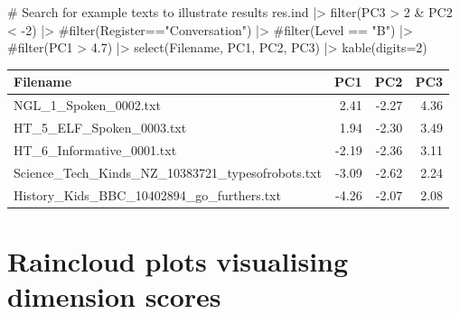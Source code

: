 \documentclass[
  letterpaper,
  DIV=11,
  numbers=noendperiod]{scrreprt}
\newenvironment{Shaded}{\begin{snugshade}}{\end{snugshade}}
\newcommand{\AttributeTok}[1]{\textcolor[rgb]{0.40,0.45,0.13}{#1}}
\newcommand{\CommentTok}[1]{\textcolor[rgb]{0.37,0.37,0.37}{#1}}
\newcommand{\DecValTok}[1]{\textcolor[rgb]{0.68,0.00,0.00}{#1}}
\newcommand{\FunctionTok}[1]{\textcolor[rgb]{0.28,0.35,0.67}{#1}}
\newcommand{\NormalTok}[1]{\textcolor[rgb]{0.00,0.23,0.31}{#1}}
\newcommand{\SpecialCharTok}[1]{\textcolor[rgb]{0.37,0.37,0.37}{#1}}
\begin{document}
\begin{Shaded}
\begin{Highlighting}[]
\CommentTok{\# Search for example texts to illustrate results}
\NormalTok{res.ind }\SpecialCharTok{|\textgreater{}} 
  \FunctionTok{filter}\NormalTok{(PC3 }\SpecialCharTok{\textgreater{}} \DecValTok{2} \SpecialCharTok{\&}\NormalTok{ PC2 }\SpecialCharTok{\textless{}} \SpecialCharTok{{-}}\DecValTok{2}\NormalTok{) }\SpecialCharTok{|\textgreater{}} 
  \CommentTok{\#filter(Register=="Conversation") |\textgreater{} }
  \CommentTok{\#filter(Level == "B") |\textgreater{} }
  \CommentTok{\#filter(PC1 \textgreater{} 4.7) |\textgreater{} }
  \FunctionTok{select}\NormalTok{(Filename, PC1, PC2, PC3) }\SpecialCharTok{|\textgreater{}} 
  \FunctionTok{kable}\NormalTok{(}\AttributeTok{digits=}\DecValTok{2}\NormalTok{)}
\end{Highlighting}
\end{Shaded}

\begin{longtable}[]{@{}lrrr@{}}
\toprule\noalign{}
Filename & PC1 & PC2 & PC3 \\
\midrule\noalign{}
\endhead
\bottomrule\noalign{}
\endlastfoot
NGL\_1\_Spoken\_0002.txt & 2.41 & -2.27 & 4.36 \\
HT\_5\_ELF\_Spoken\_0003.txt & 1.94 & -2.30 & 3.49 \\
HT\_6\_Informative\_0001.txt & -2.19 & -2.36 & 3.11 \\
Science\_Tech\_Kinds\_NZ\_10383721\_typesofrobots.txt & -3.09 & -2.62 &
2.24 \\
History\_Kids\_BBC\_10402894\_go\_furthers.txt & -4.26 & -2.07 & 2.08 \\
\end{longtable}

\section{Raincloud plots visualising dimension
scores}\label{raincloud-plots-visualising-dimension-scores}
\end{document}
